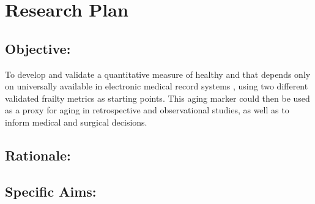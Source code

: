 \section{Research Plan }\label{research-plan}


\subsection{Objective:}\label{objective}
  
To develop and validate a quantitative measure of healthy and that depends only on universally available in electronic medical record systems ,
using two different validated frailty metrics as starting points. This
aging marker could then be used as a proxy for aging in retrospective
and observational studies, as well as to inform medical and surgical
decisions.


\subsection{Rationale:}\label{rationale}

\subsection{Specific Aims:}\label{specific-aims}
